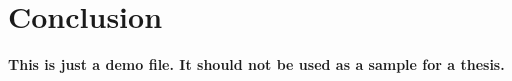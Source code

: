 \chapter{Conclusion}
\label{chapter:conclusion}

\textbf{This is just a demo file. It should not be used as a sample for a thesis.}\\

